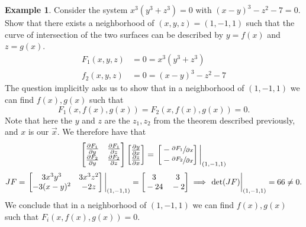 \documentclass[
	12pt,
	]{article}
\theoremstyle{custom}
\theoremstyle{custom}
\theoremstyle{custom}
\theoremstyle{custom}
\theoremstyle{custom}
\theoremstyle{definition}
\newtheorem{example}{Example}[section]
\theoremstyle{example}
\theoremstyle{note}
\theoremstyle{remark}
\theoremstyle{example}
\newcounter{theo}[section]\setcounter{theo}{0}
\numberwithin{equation}{subsection}
\begin{document}
	   		 \begin{example}
	   		 	Consider the system $x^{3}(y^{3} + z^{3}) = 0 $ with $(x-y)^{3} - z^{2} - 7 =0$. Show that there exists a neighborhood of $(x,y,z) = (1,-1,1)$ such that the curve of intersection of the two surfaces can be described by $y = f(x)$ and $z= g(x)$.
	   		 	\begin{align*}
	   		 		F_{1}(x,y,z) &=0= x^{3}(y^{3} + z^{3}) \\
	   		 		f_{2}(x,y,z) &= 0 = (x-y)^{3} -z^{2}-7
	   		 	\end{align*}
	   		 	The question implicitly asks us to show that in a neighborhood of $(1,-1,1)$ 
	   		 	we can find $f(x), g(x)$ such that 
	   		 	\begin{equation*}
	   		 		F_{1}(x, f(x) , g(x)) = F_{2}(x, f(x), g(x)) = 0.
	   		 	\end{equation*}
	   		 	Note that here the $y$ and $z$ are the $z_{1}, z_{2}$ from the theorem described previously, and $x$ is our $\vec{x}$. We therefore have that 
	   		 	\begin{equation*}
	   		 		\begin{bmatrix}
	   		 			\pdv{F_{1}}{y} & \pdv{F_{1}}{z} \\
	   		 			\pdv{F_{2}}{y} & \pdv{F_{2}}{z}
	   		 		\end{bmatrix}
	   		 		\begin{bmatrix}
	   		 			\pdv{y}{x} \\
	   		 			\pdv{z}{x} 
	   		 		\end{bmatrix}
	   		 		= 
	   		 		\eval{\begin{bmatrix}
	   		 			   		 			\vphantom{\pdv{y}{x}}- \sfrac{\partial F_{1}}{\partial x} \\
	   		 			   		 			\vphantom{\pdv{y}{x}}- \sfrac{\partial F_{2}}{ \partial x}
	   		 			   		 		\end{bmatrix}}_{(1,-1,1)}
	   		 	\end{equation*}
	   		 	\begin{equation*}
	   		 		JF = 
	   		 		\eval{
	   		 			\begin{bmatrix}
	   		 				3x^{3}y^{3} & 3x^{3}z^{2} \\
	   		 				-3(x-y)^{2} & -2z 
	   		 			\end{bmatrix}
	   		 		}_{(1,-1,1)} = 
	   		 		\begin{bmatrix}
	   		 			\vphantom{3x^{3}y^{3} }3 & \vphantom{3x^{3}y^{3} }3 \\
	   		 			\vphantom{3x^{3}y^{3} }-24 &\vphantom{3x^{3}y^{3} } -2
	   		 		\end{bmatrix}
	   		 		\implies \eval{\det(JF)}_{(1,-1,1)} = 66 \neq 0.
	   		 	\end{equation*}
	   		 We conclude that in a neighborhood of $(1,-1,1)$ we can find $f(x) , g(x)$ such that $F_{i}(x, f(x), g(x)) = 0$.
	   		 \end{example}
	   		 
\end{document}
